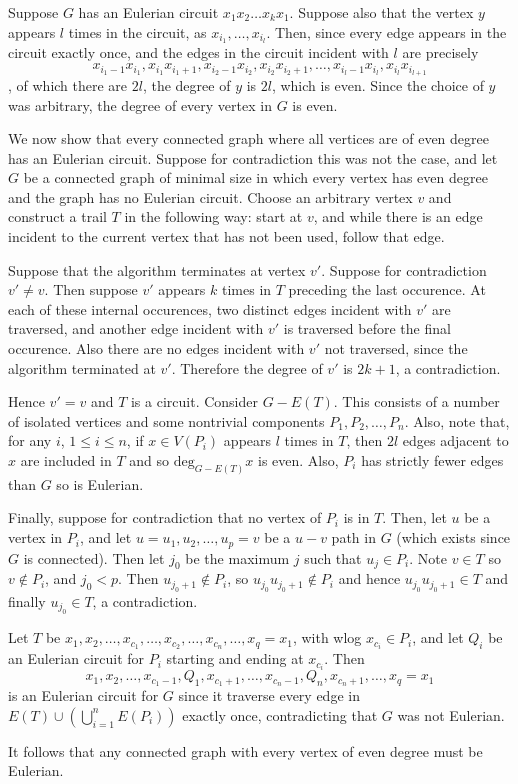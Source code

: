 Suppose $G$ has an Eulerian circuit $x_1x_2\dots x_kx_1$. Suppose also
that the vertex $y$ appears $l$ times in the circuit, as 
$x_{i_1},\dots,x_{i_l}$. Then, since every edge appears in the circuit
exactly once, and the edges in the circuit incident with $l$ are precisely
$$x_{i_1-1}x_{i_1},x_{i_1}x_{i_1+1},x_{i_2-1}x_{i_2},x_{i_2}x_{i_2+1},\dots,x_{i_l-1}x_{i_l},x_{i_l}x_{i_{l+1}}$$, of which there are $2l$, the degree
of $y$ is $2l$, which is even. Since the choice of $y$ was arbitrary, the
degree of every vertex in $G$ is even.

We now show that every connected
graph where all vertices are of even degree has
an Eulerian circuit. Suppose for contradiction this was not the case, and
let $G$ be a connected graph of minimal
size in which every vertex has even degree
and the graph has no Eulerian circuit. Choose an arbitrary vertex $v$ and
construct a trail $T$ in the following way: start at $v$, and while there is
an edge incident to the current vertex that has not been used,
follow that edge. 

Suppose that
the algorithm terminates at vertex $v'$. Suppose for contradiction
$v' \neq v$. Then suppose $v'$ appears $k$ times in $T$ preceding the
last occurence. At each of these internal occurences, two distinct edges
incident with $v'$ are traversed, and another edge incident with $v'$ is
traversed before the final occurence. Also there are no edges incident with
$v'$ not traversed, since the algorithm terminated at $v'$. Therefore the
degree of $v'$ is $2k+1$, a contradiction.

Hence $v'=v$ and $T$ is a circuit. Consider $G-E(T)$. This consists of
a number of isolated vertices and some nontrivial components 
$P_1,P_2,\dots,P_n$. Also, note that, for any $i$, $1 \le i \le n$,
if $x \in V(P_i)$ appears $l$ times in $T$, then $2l$ edges adjacent to $x$
are included in $T$ and so $\text{deg}_{G-E(T)} x$ is even. Also, $P_i$
has strictly fewer edges than $G$ so is Eulerian. 

Finally, suppose for
contradiction that no vertex of $P_i$ is in $T$. Then, let $u$ be a vertex
in $P_i$, and let $u=u_1,u_2,\dots,u_p=v$ be a $u-v$ path in $G$ (which
exists since $G$ is connected). Then
let $j_0$ be the maximum $j$ such that $u_j \in P_i$. Note $v\in T$ so
$v \notin P_i$, and $j_0<p$. Then $u_{j_0+1} \notin P_i$, so
$u_{j_0}u_{j_0+1} \notin P_i$ and hence $u_{j_0}u_{j_0+1} \in T$ and 
finally $u_{j_0} \in T$, a contradiction.

Let $T$ be $x_1,x_2,\dots,x_{c_1},\dots,x_{c_2},\dots,x_{c_n},\dots,
x_q=x_1$, with
wlog $x_{c_i} \in P_i$, and let $Q_i$ be an Eulerian circuit for $P_i$ 
starting and ending at $x_{c_i}$. Then
$$x_1,x_2,\dots,x_{c_1-1},Q_1,x_{c_1+1},\dots,x_{c_n-1},Q_n,
x_{c_n+1},\dots,x_q=x_1$$
is an Eulerian circuit for $G$ since it traverse every edge in 
$E(T) \cup \left( \bigcup_{i=1}^n E(P_i)\right)$ exactly once,
contradicting that
$G$ was not Eulerian.

It follows that any connected graph with every vertex of even degree must
be Eulerian.
